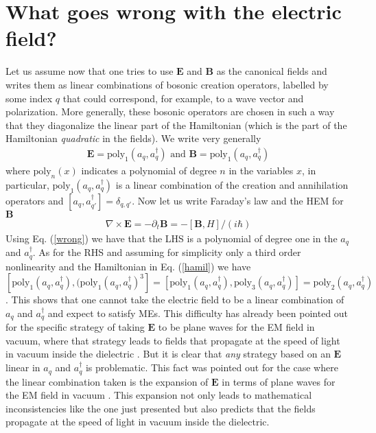\documentclass[letterpaper,10pt]{article}
\newcommand{\poly}{\text{poly}}
\begin{document}
\section{What goes wrong with the electric field?}
Let us assume now that one tries to use $\mathbf{E}$ and $\mathbf{B}$ as the canonical fields and writes them as linear combinations of bosonic creation operators, labelled by some index $q$ that could correspond, for example, to a wave vector and polarization. More generally, these bosonic operators are chosen in such a way that they diagonalize the linear part of the Hamiltonian (which is the part of the Hamiltonian \emph{quadratic} in the fields). We write very generally
\begin{align}\label{wrong}
\mathbf{E}=\poly_1(a_q,a_q^\dagger) \text{ and } \mathbf{B}=\poly_1(a_q,a_q^\dagger)
\end{align} 
where $\poly_n(x)$ indicates a polynomial of degree $n$ in the variables $x$, in particular, $\poly_1(a_q,a_q^\dagger)$ is a linear combination of the creation and annihilation operators and $[a_q,a_{q'}^\dagger]=\delta_{q,q'}$. Now let us write Faraday's law and the HEM for $\mathbf{B}$
\begin{align}
\nabla \times \mathbf{E} = -\partial_t \mathbf{B} = -[\mathbf{B},H] /(i \hbar)
\end{align}
Using Eq. (\ref{wrong}) we have that the LHS is a polynomial of degree one in the $a_q$ and $a_q^\dagger$. As for the RHS and assuming for simplicity only a third order nonlinearity and the Hamiltonian in Eq. (\ref{hamil}) we have $[\poly_1(a_q,a_q^\dagger),(\poly_1 (a_q,a_q^\dagger)^3]= [\poly_1(a_q,a_q^\dagger),\poly_3 (a_q,a_q^\dagger)]=\poly_2 (a_q,a_q^\dagger)$. This shows that one cannot take the electric field to be a linear combination of $a_q$ and $a_q^\dagger$ and expect to satisfy MEs. This difficulty has already been pointed out for the specific strategy of taking $\mathbf{E}$ to be plane waves for the EM field in vacuum\cite{hillery}, where that strategy leads to fields that propagate at the speed of light in vacuum inside the dielectric \cite{drummond}. But it is clear that \emph{any} strategy based on an $\mathbf{E}$ linear in $a_q$ and $a_q^\dagger$ is problematic. This fact was pointed out for the case where the linear combination taken is the expansion of $\mathbf{E}$ in terms of plane waves for the EM field in vacuum  \cite{hillery}. This expansion not only leads to mathematical inconsistencies like the one just presented but also predicts that the fields propagate at the speed of light in vacuum inside the dielectric\cite{drummond}. \\
\end{document}
